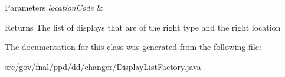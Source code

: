 \begin{DoxyParams}{Parameters}
{\em location\-Code} & \\
\hline
\end{DoxyParams}
\begin{DoxyReturn}{Returns}
The list of displays that are of the right type and the right location 
\end{DoxyReturn}


The documentation for this class was generated from the following file\-:\begin{DoxyCompactItemize}
\item 
src/gov/fnal/ppd/dd/changer/Display\-List\-Factory.\-java\end{DoxyCompactItemize}
